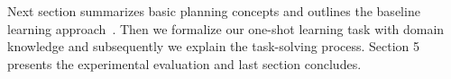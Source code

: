 \documentclass{article}
\newcommand{\strips}{\textsc{Strips}}
\begin{document}
Next section summarizes basic planning concepts and outlines the baseline learning approach~\cite{aineto2018learning}. Then we formalize our one-shot learning task with domain knowledge and subsequently we explain the task-solving process. Section 5 presents the experimental evaluation and last section concludes.





\end{document}
